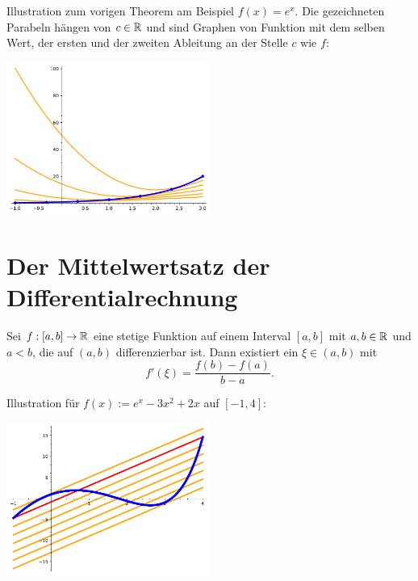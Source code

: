 \begin{bem}
	Illustration zum vorigen Theorem am Beispiel $f(x) = e^x$. Die gezeichneten Parabeln hängen von $c \in \mathbb{R}$ und sind Graphen von Funktion mit dem selben Wert, der ersten und der zweiten Ableitung an der Stelle $c$ wie $f$: 
	\begin{center}
			\includegraphics[width=0.5\textwidth]{pics/konvex_2.pdf}
	\end{center} 
\end{bem} 

\section{Der Mittelwertsatz der Differentialrechnung} 

\begin{thm}
	Sei $f: [a,b] \to \mathbb{R}$ eine stetige Funktion auf einem Interval $[a,b]$ mit $a,b \in \mathbb{R}$ und $a<b$, die auf $(a,b)$ differenzierbar ist. Dann existiert ein $\xi \in (a,b)$ mit 
	\[
		f'(\xi) = \frac{f(b) - f(a)}{b-a}. 
	\]
\end{thm} 

\begin{bem}
Illustration für $f (x) := e^x -3x^2 + 2 x$ auf $[-1,4]$:
\begin{center}
\includegraphics[width=0.5\textwidth]{pics/mittelwertsatz.pdf}
\end{center} 
\end{bem} 

